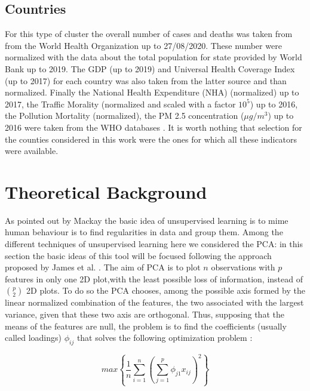 \documentclass[
12pt, %
a4paper, %
oneside, %
headinclude,footinclude, %
BCOR5mm, %
]{scrartcl}
\begin{document}
\subsection{Countries}

For this type of cluster the overall number of cases and deaths was taken from from the World Health Organization \cite{whoCases} up to 27/08/2020. These number were normalized with the data about the total population for state provided by World Bank \cite{worldBank} up to 2019. The GDP (up to 2019) and Universal Health Coverage Index \cite{whoUHC} (up to 2017) for each country was also taken from the latter source \cite{worldBank} and than normalized. Finally the National Health Expenditure (NHA) (normalized) up to 2017, the Traffic Morality (normalized and scaled with a factor $10^{5}$) up to 2016, the Pollution Mortality (normalized), the PM 2.5 concentration ($\mu g/m^{3}$) up to 2016 were taken from the WHO databases \cite{whoDb}. It is worth nothing that selection for the counties considered in this work were the ones for which all these indicators were available. 


\section{Theoretical Background} \label{Theoretical Background}
As pointed out by Mackay \cite{mackay2003information} the basic idea of unsupervised learning is to mime human behaviour is to find regularities in data and group them. Among the different techniques of unsupervised learning \cite{james2013introduction} here we considered the PCA: in this section the basic ideas of this tool will be focused following the approach proposed by James et al. \cite{james2013introduction}. The aim of PCA is to plot $n$ observations with $p$ features in only one 2D plot,with the least possible loss of information, instead of $\binom{p}{2}$ 2D plots. To do so the PCA chooses, among the possible axis formed by the linear normalized combination of the features, the two associated with the largest variance, given that these two axis are orthogonal. Thus, supposing that the means of the features are null, the problem is to find the coefficients (usually called loadings) $\phi_{ij}$ that solves the following optimization problem  \cite{james2013introduction}:

\begin{equation}
max\left\lbrace \dfrac{1}{n} \sum_{i=1}^{n} \left(\sum^{p} _{j=1} \phi_{j1}x_{ij} \right)^{2}   \right\rbrace
\end{equation}
\end{document}
